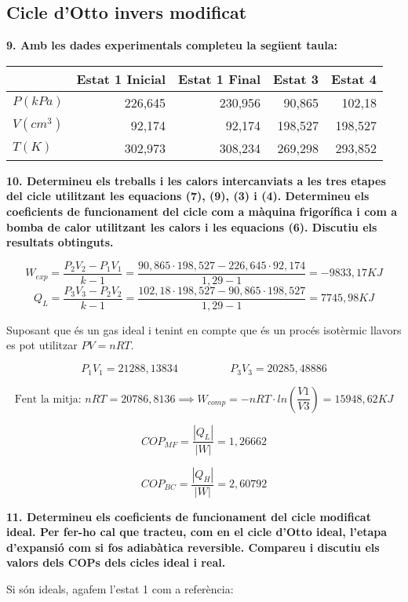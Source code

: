 \documentclass[a4paper]{article}
\begin{document}
\subsection*{Cicle d'Otto invers modificat}

\textbf{9. Amb les dades experimentals completeu la següent taula:}

\begin{center}
	\begin{tabular}{l|rrrr}
		& Estat 1 Inicial & Estat 1 Final & Estat 3 & Estat 4 \\
		\hline
		$P(kPa)$ & 226,645 & 230,956 & 90,865 & 102,18 \\
		$V(cm^3)$ & 92,174 & 92,174 & 198,527 & 198,527 \\
		$T(K)$ & 302,973 & 308,234 & 269,298 & 293,852 \\
	\end{tabular}
\end{center}

\textbf{10. Determineu els treballs i les calors intercanviats a les tres etapes del cicle utilitzant les equacions (7), (9), (3) i (4). Determineu els coeficients de funcionament del cicle com a màquina frigorífica i com a bomba de calor utilitzant les calors i les equacions (6). Discutiu els resultats obtinguts.}

$$ W_{exp} = \frac{P_2 V_2 - P_1 V_1}{k - 1} = 
\frac{90,865·198,527 - 226,645·92,174}{1,29 - 1} = \boxed{-9833,17 KJ} $$
$$ Q_L = \frac{P_3 V_3 - P_2 V_2}{k - 1} = 
\frac{102,18·198,527 - 90,865·198,527}{1,29-1} = \boxed{7745,98 KJ} $$

Suposant que és un gas ideal i tenint en compte que és un procés isotèrmic llavors es pot utilitzar $ PV = nRT$.

$$ P_1 V_1 = 21288,13834 \hspace{2cm} P_3 V_3 = 20285,48886 $$

$$ \text{Fent la mitja: } nRT = 20786,8136 \implies W_{comp} = -nRT·ln\left(\frac{V1}{V3}\right) = \boxed{15948,62 KJ} $$

$$ COP_{MF} = \frac{|Q_L|}{|W|} = \boxed{1,26662} $$

$$ COP_{BC} = \frac{|Q_H|}{|W|} = \boxed{2,60792} $$

\textbf{11. Determineu els coeficients de funcionament del cicle modificat ideal. Per fer-ho cal que tracteu, com en el cicle d'Otto ideal, l'etapa d'expansió com si fos adiabàtica reversible. Compareu i discutiu els valors dels COPs dels cicles ideal i real.}

Si són ideals, agafem l'estat 1 com a referència:
\end{document}
